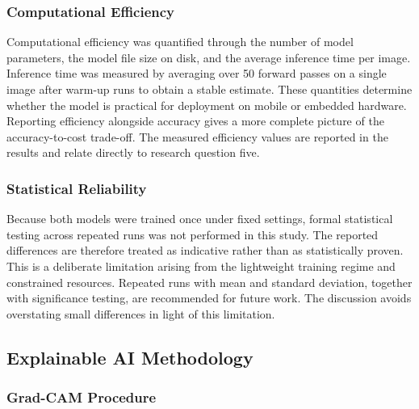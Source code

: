 \documentclass[preprint,12pt]{elsarticle}
\begin{document}
\subsubsection{Computational Efficiency}

Computational efficiency was quantified through the number of model parameters, the model file size on disk, and the average inference time per image.
Inference time was measured by averaging over 50 forward passes on a single image after warm-up runs to obtain a stable estimate.
These quantities determine whether the model is practical for deployment on mobile or embedded hardware.
Reporting efficiency alongside accuracy gives a more complete picture of the accuracy-to-cost trade-off.
The measured efficiency values are reported in the results and relate directly to research question five.

\subsubsection{Statistical Reliability}

Because both models were trained once under fixed settings, formal statistical testing across repeated runs was not performed in this study.
The reported differences are therefore treated as indicative rather than as statistically proven.
This is a deliberate limitation arising from the lightweight training regime and constrained resources.
Repeated runs with mean and standard deviation, together with significance testing, are recommended for future work.
The discussion avoids overstating small differences in light of this limitation.

\subsection{Explainable AI Methodology}

\subsubsection{Grad-CAM Procedure}
\end{document}

